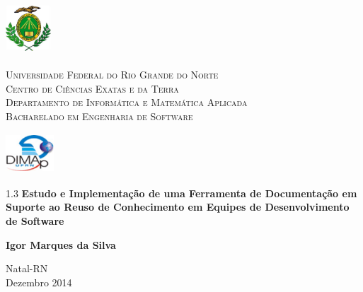 
\begin{titlepage}
	\begin{center}
		
		\begin{minipage}{2cm}
			\begin{center}
				\includegraphics[width=1.7cm, height=2.0cm]{Imagens/Brasao-UFRN.jpg}
			\end{center}
		\end{minipage}
		\begin{minipage}{11cm}
			\begin{center}
				\begin{espacosimples}
					{\small \textsc{Universidade Federal do Rio Grande do Norte}			\\
							  \textsc{Centro de Ciências Exatas e da Terra}						\\
							  \textsc{Departamento de Informática e Matemática Aplicada}	\\
							  \textsc{Bacharelado em Engenharia de Software}}
				\end{espacosimples}
			\end{center}
		\end{minipage}
		\begin{minipage}{2cm}
			\begin{center}
				\includegraphics[width=1.8cm, height=1.5cm]{Imagens/Logotipo-DIMAp.jpg}
			\end{center}
		\end{minipage}
			
		\vspace{5cm}
						
		{\setlength{\baselineskip}%
		{1.3\baselineskip}
		{\LARGE \textbf{Estudo e Implementação de uma Ferramenta de Documentação em Suporte ao Reuso de Conhecimento em Equipes de Desenvolvimento de Software}}\par}
			
		\vspace{4cm}
			
		{\large \textbf{Igor Marques da Silva}}
						
		\vspace{7cm}
		
		Natal-RN\\Dezembro 2014
	\end{center}
\end{titlepage}